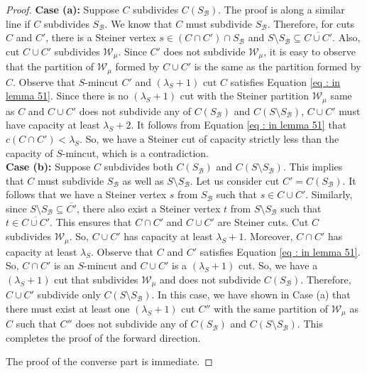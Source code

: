 \documentclass[letterpaper,11pt]{article}
\begin{document}
\begin{proof}
    \noindent
    \textbf{Case (a):} Suppose $C$ subdivides $C(S_{\mathcal B})$. The proof is along a similar line if $C$ subdivides $S_{\mathcal B}$. We know that $C$ must subdivide $S_{\mathcal B}$. Therefore, for cuts $C$ and $C'$, there is a Steiner vertex $s\in (C\cap C') \cap S_{\mathcal B}$ and $S\setminus S_{\mathcal B}\subseteq \overline{C\cup C'}$. Also, cut $C\cup C'$  subdivides ${\mathcal W}_{\mu}$. Since $C'$ does not subdivide ${\mathcal W}_{\mu}$, it is easy to observe that the partition of ${\mathcal W}_{\mu}$ formed by $C\cup C'$ is the same as the partition formed by $C$. Observe that $S$-mincut $C'$ and $(\lambda_S+1)$ cut $C$ satisfies Equation \ref{eq : in lemma 51}.
    Since there is no $(\lambda_S+1)$ cut with the Steiner partition ${\mathcal W}_{\mu}$ same as $C$ and  $C\cup C'$ does not subdivide any of $C(S_{\mathcal B})$ and $C(S\setminus S_{\mathcal B})$, $C\cup C'$ must have capacity at least $\lambda_S+2$. It follows from Equation \ref{eq : in lemma 51} that $c(C\cap C')<\lambda_S$. So, we have a Steiner cut of capacity strictly less than the capacity of $S$-mincut, which is a contradiction. \\

    \noindent
    \textbf{Case (b):}  Suppose $C$ subdivides both $C(S_{\mathcal B})$ and $C(S\setminus S_{\mathcal B})$. This implies that $C$ must subdivide $S_{\mathcal B}$ as well as $S\setminus S_{\mathcal B}$. Let us consider cut $C'=C(S_{\mathcal B})$. It follows that we have a Steiner vertex $s$ from $S_{\mathcal B}$ such that $s\in C\cup C'$. Similarly, since $S\setminus S_{\mathcal B}\subseteq \overline{C'}$, there also exist a Steiner vertex $t$ from $S\setminus S_{\mathcal B}$ such that $t\in \overline{C\cup C'}$. This ensures that $C\cap C'$ and $C\cup C'$ are Steiner cuts. Cut $C$ subdivides ${\mathcal W}_{\mu}$. So, $C\cup C'$ has capacity at least $\lambda_S+1$. Moreover, $C\cap C'$ has capacity at least $\lambda_S$. Observe that $C$ and $C'$ satisfies Equation \ref{eq : in lemma 51}. So, $C\cap C'$ is an $S$-mincut and $C\cup C'$ is a $(\lambda_S+1)$ cut. So, we have a $(\lambda_S+1)$ cut that subdivides ${\mathcal W}_{\mu}$ and does not subdivide $C(S_{\mathcal B})$. Therefore, $C\cup C'$ subdivide only $C(S\setminus S_{\mathcal B})$. In this case, we have shown in Case (a) that there must exist at least one $(\lambda_S+1)$ cut $C''$ with the same partition of ${\mathcal W}_{\mu}$ as $C$ such that $C''$ does not subdivide any of $C(S_{\mathcal B})$ and $C(S\setminus S_{\mathcal B})$. This completes the proof of the forward direction. 

        The proof of the converse part is immediate. 
\end{proof} 
\end{document}
